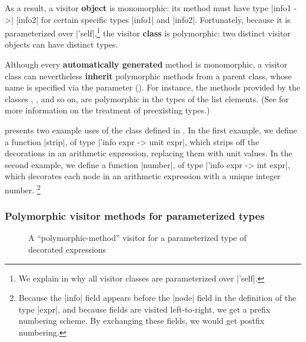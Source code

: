 \documentclass[11pt,a4paper,twoside]{article}
\renewcommand{\emph}[1]{\textbf{#1}}
\begin{document}
As a result, a visitor \emph{object} is monomorphic: its method
 must have type \oc|info1 ->| \oc|info2| for certain
specific types \oc|info1| and \oc|info2|. Fortunately, because it is
parameterized over \oc|'self|,\footnote{We explain in  why
  all visitor classes are parameterized over \oc|'self|.} the visitor
\emph{class} is polymorphic: two distinct visitor objects can have distinct
types.

Although every \emph{automatically generated} method
is monomorphic, a visitor class can nevertheless \emph{inherit} polymorphic
methods from a parent class, whose name is specified via the \ancestors parameter
(). For instance, the  methods provided by
the classes , , and so on, are
polymorphic in the types of the list elements. (See 
for more information on the treatment of preexisting types.)

 presents two example uses of the class \map defined in
. In the first example, we define a function \oc|strip|, of
type \oc|'info expr -> unit expr|, which strips off the decorations in an
arithmetic expression, replacing them with unit values. In the second example,
we define a function \oc|number|, of type \oc|'info expr -> int expr|, which
decorates each node in an arithmetic expression with a unique integer number.%
\footnote{Because the \oc|info| field appears before the \oc|node| field in
  the definition of the type \oc|expr|, and because fields are visited
  left-to-right, we get a prefix numbering scheme. By exchanging these fields,
  we would get postfix numbering.} %


\subsubsection{Polymorphic visitor methods for parameterized types}
\label{sec:intro:parameterized:poly}

\begin{figure}[p]
\vspace{-\baselineskip}
\caption{A ``polymorphic-method'' visitor for a parameterized type of decorated expressions}
\label{fig:expr_info_polymorphic}
\end{figure}
\end{document}
